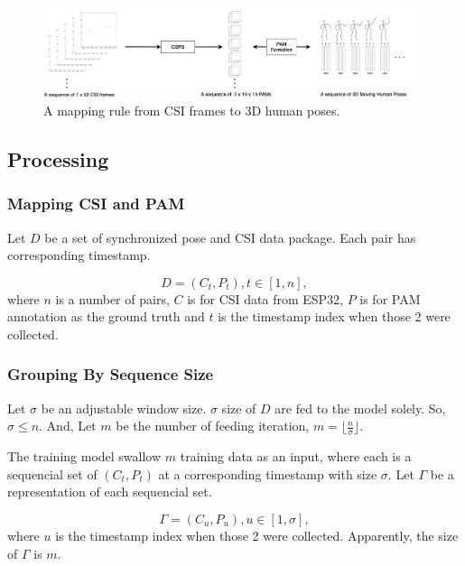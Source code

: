 \documentclass[10pt,letterpaper]{article}
\begin{document}
	\begin{figure}[htbp]
		\centerline{\includegraphics[width=110mm,scale=0.5]{STEP06.png}}
		\caption{A mapping rule from CSI frames to 3D human poses.}
		\label{fig:STEP01}
	\end{figure}
	
	
	
	\subsection*{Processing}
	
	
	\subsubsection*{Mapping CSI and PAM}
	Let $D$ be a set of synchronized pose and CSI data package. Each pair has corresponding timestamp.
	
	\begin{equation}
	D =  {(C_t, P_t), t \in [1, n]},
	\label{eq:Dataset}
	\end{equation} where  $n$ is a number of pairs, $C$ is for CSI data from ESP32, $P$ is for PAM annotation as the ground truth and $t$ is the timestamp index when those 2 were collected.
	
	
	
	\subsubsection*{Grouping By Sequence Size}
	
	Let $\sigma$ be an adjustable window size. $\sigma$ size of $D$ are fed to the model solely. So,  $\sigma \le n$. And, Let $m$ be the number of feeding iteration, $m = \lfloor \frac{n}{\sigma} \rfloor$.
	
	
	The training model swallow $m$ training data as an input, where each is a sequencial set of $(C_t,P_t)$ at a corresponding timestamp with size $\sigma$.
	Let $\Gamma$ be a representation of each sequencial set.
	
	\begin{equation}
	\Gamma =  {(C_u, P_u), u \in [1, \sigma]},
	\label{eq:SubDataset}
	\end{equation}
	where $u$ is the timestamp index when those 2 were collected. Apparently, the size of $\Gamma$ is $m$.
	
\end{document}
